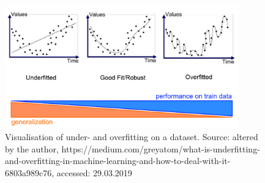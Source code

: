 \begin{figure}[h]
   \centering
   \includegraphics[width=0.9\textwidth]{img/over_underfitting}
   \caption{Visualisation of under- and overfitting on a dataset. Source: altered by the author, https://medium.com/greyatom/what-is-underfitting-and-overfitting-in-machine-learning-and-how-to-deal-with-it-6803a989c76, accessed: 29.03.2019}
   \label{fig:over_underfitting}
\end{figure}

